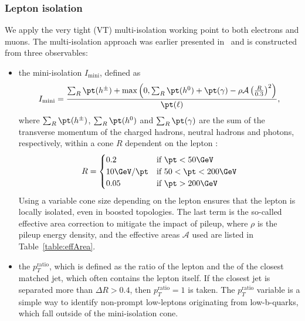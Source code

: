     \subsubsection{Lepton isolation}
      We apply the very tight (VT) multi-isolation working point to both electrons and muons. The multi-isolation approach was earlier presented in~\citep{CMS_NOTE_2015-133} and is constructed from three observables:
      \begin{itemize}
        \item the mini-isolation $I_\text{mini}$, defined as
              \begin{equation}
                I_\text{mini} = \frac{\sum_R \pt(h^\pm) + \text{max}\left(0, \sum_R \pt(h^0)+\pt(\gamma) - \rho\mathcal{A}\left(\frac{R}{0.3}\right)^2\right)}{\pt(\ell)},
              \end{equation}
              where $\sum_R\pt(h^\pm)$, $\sum_R\pt(h^0)$ and $\sum_R\pt(\gamma)$ are the sum of the transverse momentum of the charged hadrons, neutral hadrons and photons, respectively, within a cone $R$
              dependent on the lepton \pt:
              \begin{equation}
                  R = \begin{cases}
		    0.2          & \text{if } \pt < 50\GeV \\
		    10\GeV/\pt   & \text{if } 50 < \pt < 200\GeV \\
		    0.05         & \text{if } \pt > 200\GeV
                  \end{cases}
              \end{equation}
              Using a variable cone size depending on the lepton \pt ensures that the lepton is locally isolated, even in boosted topologies.
              The last term is the so-called effective area correction to mitigate the impact of pileup, where $\rho$ is the pileup energy density, %
              and the effective areas $\mathcal{A}$ used are listed in Table~\ref{table:effArea}.
              
        \item the $p_T^\text{ratio}$, which is defined as the ratio of the lepton \pt and the \pt of the closest matched jet, which often contains the lepton itself. 
              If the closest jet is separated more than $\Delta R > 0.4$, then $p_T^\text{ratio} = 1$ is taken. 
              The $p_T^\text{ratio}$ variable is a simple way to identify non-prompt low-\pt leptons originating from low-\pt b-quarks, which fall outside of the mini-isolation cone.

\end{itemize}
